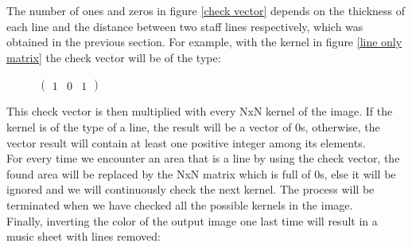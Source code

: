 \documentclass[a4paper,12pt]{report}
\begin{document}
The number of ones and zeros in figure \ref{check vector} depends on
the thickness of each line and the distance between two staff lines
respectively, which was obtained in the previous section.  For example, with the
kernel in figure \ref{line only matrix} the check vector will be of the type:

\begin{figure}[h!]
    \centering
    $
    \begin{pmatrix}
       1 & 0 & 1 
    \end{pmatrix}
    $\\
\end{figure}

 This check vector is then multiplied with every NxN kernel of the image. If the
 kernel is of the type of a line, the result will be a vector of 0s, otherwise,
 the vector result will contain at least one positive integer among its
 elements.\\

 For every time we encounter an area that is a line by using the check vector,
 the found area will be replaced by the NxN matrix which is full of 0s, else it
 will be ignored and we will continuously check the next kernel. The process
 will be terminated when we have checked all the possible kernels in the
 image.\\

\clearpage
Finally, inverting the color of the output image one last time will result in a
music sheet with lines removed:
\begin{center}
\end{center}
\end{document}
